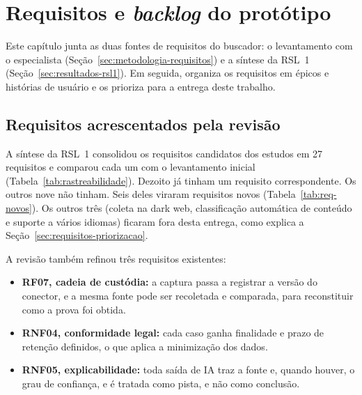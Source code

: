 \begingroup
\setlength{\emergencystretch}{3em}

\chapter{Requisitos e \textit{backlog} do protótipo}
\label{cap:requisitos}

Este capítulo junta as duas fontes de requisitos do buscador: o levantamento
com o especialista (Seção~\ref{sec:metodologia-requisitos}) e a síntese da
RSL~1 (Seção~\ref{sec:resultados-rsl1}). Em seguida, organiza os requisitos em
épicos e histórias de usuário e os prioriza para a entrega deste trabalho.

\section{Requisitos acrescentados pela revisão}
\label{sec:requisitos-novos}

A síntese da RSL~1 consolidou os requisitos candidatos dos estudos em 27
requisitos e comparou cada um com o levantamento inicial
(Tabela~\ref{tab:rastreabilidade}). Dezoito já tinham um requisito
correspondente. Os outros nove não tinham. Seis deles viraram requisitos
novos (Tabela~\ref{tab:req-novos}). Os outros três (coleta na dark web,
classificação automática de conteúdo e suporte a vários idiomas) ficaram
fora desta entrega, como explica a Seção~\ref{sec:requisitos-priorizacao}.



A revisão também refinou três requisitos existentes:
\begin{itemize}
	\item \textbf{RF07, cadeia de custódia:} a captura passa a registrar a
	versão do conector, e a mesma fonte pode ser recoletada e comparada, para
	reconstituir como a prova foi obtida.
	\item \textbf{RNF04, conformidade legal:} cada caso ganha finalidade e
	prazo de retenção definidos, o que aplica a minimização dos dados.
	\item \textbf{RNF05, explicabilidade:} toda saída de IA traz a fonte e,
	quando houver, o grau de confiança, e é tratada como pista, e não como
	conclusão.
\end{itemize}

